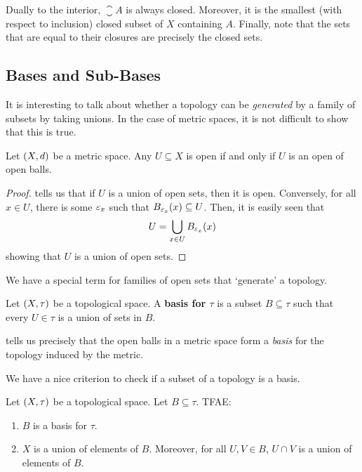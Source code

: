 Dually to the interior, $\closure{A}$ is always closed. Moreover, it is the smallest (with respect to inclusion) closed subset of $X$ containing $A$. Finally, note that the sets that are equal to their closures are precisely the closed sets.

\subsection{Bases and Sub-Bases}

It is interesting to talk about whether a topology can be \textit{generated} by a family of subsets by taking unions. In the case of metric spaces, it is not difficult to show that this is true.

\begin{boxproposition}\label{Ch1:Prop:Met_Top_gen_by_open_balls}
    Let $\left( X, d \right)$ be a metric space. Any $U \subseteq X$ is open if and only if $U$ is an open of open balls.
\end{boxproposition}
\begin{proof}
     tells us that if $U$ is a union of open sets, then it is open. Conversely, for all $x \in U$, there is some $\varepsilon_x$ such that $B_{\varepsilon_x}(x) \subseteq U$. Then, it is easily seen that
    \begin{align*}
        U = \bigcup_{x \in U} B_{\varepsilon_x}(x)
    \end{align*}
    showing that $U$ is a union of open sets.
\end{proof}

We have a special term for families of open sets that `generate' a topology.

\begin{boxdefinition}
    Let $\left( X, \tau \right)$ be a topological space. A \textbf{basis for $\tau$} is a subset $B \subseteq \tau$ such that every $U \in \tau$ is a union of sets in $B$.
\end{boxdefinition}

 tells us precisely that the open balls in a metric space form a \textit{basis} for the topology induced by the metric.

We have a nice criterion to check if a subset of a topology is a basis.

\begin{boxproposition}
    Let $\left( X, \tau \right)$ be a topological space. Let $B \subseteq \tau$. TFAE:
    \begin{enumerate}
        \item $B$ is a basis for $\tau$.
        \item $X$ is a union of elements of $B$. Moreover, for all $U, V \in B$, $U \cap V$ is a union of elements of $B$.
    \end{enumerate}
\end{boxproposition}

